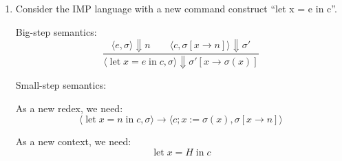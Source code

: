 \documentclass{article}
\begin{document}
\begin{enumerate}
  \item Consider the IMP language with a new command construct ``let x = e in
  c''.
  \newcommand{\letin}[2]{\operatorname{let} x = #1 \operatorname{in} #2}

Big-step semantics:
  \[\frac{
  \langle e, \sigma \rangle \Downarrow n    \qquad
  \langle c, \sigma[x \rightarrow n] \rangle \Downarrow \sigma' }
  {\langle \letin{e}{c}, \sigma \rangle \Downarrow
          \sigma'[x \rightarrow \sigma(x)]}
  \]

Small-step semantics:

  As a new redex, we need:
  \[
  \langle \letin{n}{c}, \sigma \rangle \rightarrow
      \langle c; x:= \sigma(x), \sigma[x \rightarrow n] \rangle
  \]

  As a new context, we need:
  \[
    \letin{H}{c}
  \]
\end{enumerate}
\end{document}

